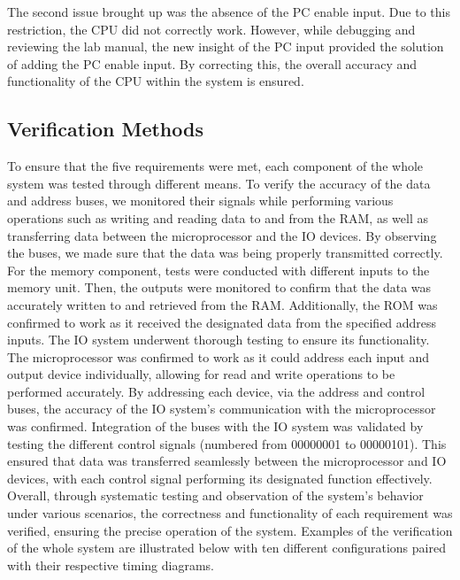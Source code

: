 \documentclass{article}
\begin{document}
The second issue brought up was the absence of the PC enable input. 
Due to this restriction, the CPU did not correctly work. 
However, while debugging and reviewing the lab manual, the new insight of the PC input provided the solution of adding the PC enable input. 
By correcting this, the overall accuracy and functionality of the CPU within the system is ensured. 

\subsection*{Verification Methods}
To ensure that the five requirements were met, each component of the whole system was tested through different means.
To verify the accuracy of the data and address buses, we monitored their signals while performing various operations such as writing and reading data to and from the RAM, as well as transferring data between the microprocessor and the IO devices. 
By observing the buses, we made sure that the data was being properly transmitted correctly.
For the memory component, tests were conducted with different inputs to the memory unit. 
Then, the outputs were monitored to confirm that the data was accurately written to and retrieved from the RAM. 
Additionally, the ROM was confirmed to work as it received the designated data from the specified address inputs.
The IO system underwent thorough testing to ensure its functionality. 
The microprocessor was confirmed to work as it could address each input and output device individually, allowing for read and write operations to be performed accurately. 
By addressing each device, via the address and control buses, the accuracy of the IO system's communication with the microprocessor was confirmed.
Integration of the buses with the IO system was validated by testing the different control signals (numbered from 00000001 to 00000101). 
This ensured that data was transferred seamlessly between the microprocessor and IO devices, with each control signal performing its designated function effectively.
Overall, through systematic testing and observation of the system's behavior under various scenarios, the correctness and functionality of each requirement was verified, ensuring the precise operation of the system. 
Examples of the verification of the whole system are illustrated below with ten different configurations paired with their respective timing diagrams.
\end{document}
